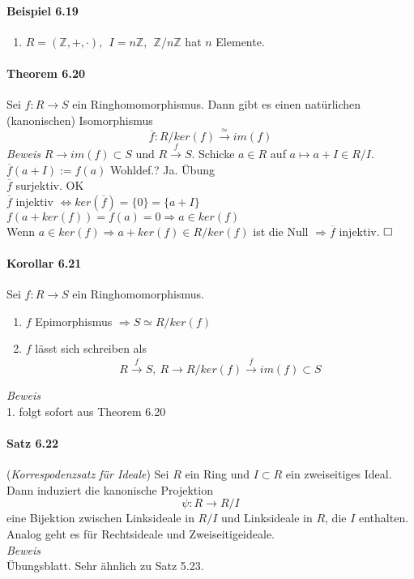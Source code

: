 \documentclass{scrartcl}
\begin{document}
\paragraph{Beispiel 6.19}
\begin{enumerate}
\item $R = (\mathbb{Z}, +, \cdot),~~ I = n\mathbb{Z},~~ \mathbb{Z}/n\mathbb{Z}$
  hat $n$ Elemente.
\end{enumerate}

\paragraph{Theorem 6.20}
Sei $f: R \to S$ ein Ringhomomorphismus. Dann gibt es einen natürlichen
(kanonischen) Isomorphismus
\[
  \overline{f}: R/ker(f) \overset{\simeq}{\to} im(f)
\]
\textit{Beweis} $R \to im(f) \subset S$ und $R \overset{f}{\to} S$. Schicke $a
\in R$ auf $a \mapsto a + I \in R/I$. \\
$\overline{f}(a + I) := f(a)$ Wohldef.? Ja. Übung \\
$\overline{f}$ surjektiv. OK \\
$\overline{f}$ injektiv $\Leftrightarrow ker(\overline{f}) = \{0\} = \{a + I\}$ \\
$f(a + ker(f)) = f(a) = 0 \Rightarrow a \in ker(f)$ \\
Wenn $a \in ker(f) \Rightarrow a + ker(f) \in R/ker(f)$ ist die Null
$\Rightarrow \overline{f}$ injektiv.
$\hfill \square$

\paragraph{Korollar 6.21}
Sei $f: R \to S$ ein Ringhomomorphismus.
\begin{enumerate}
\item $f$ Epimorphismus $\Rightarrow S \simeq R/ker(f)$
\item $f$ lässt sich schreiben als
  \[
    R \overset{f}{\to} S, ~ R \to R/ker(f) \overset{\overline{f}}{\to} im(f)
    \subset S
  \]
\end{enumerate}
\textit{Beweis} \\
1. folgt sofort aus Theorem 6.20

\paragraph{Satz 6.22}
(\textit{Korrespodenzsatz für Ideale}) Sei $R$ ein Ring und $I \subset R$ ein
zweiseitiges Ideal. Dann induziert die kanonische Projektion
\[
  \psi: R \to R/I
\]
eine Bijektion zwischen Linksideale in $R/I$ und Linksideale in $R$, die $I$
enthalten. Analog geht es für Rechtsideale und Zweiseitigeideale. \\
\textit{Beweis} \\
Übungsblatt. Sehr ähnlich zu Satz 5.23.
\end{document}
